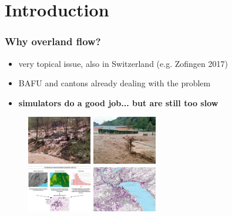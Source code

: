 \documentclass[xcolor=dvipsnames, USenglish]{beamer}  %
\begin{document}
\section{Introduction}
  \begin{frame}
    \frametitle{Why overland flow?}
    \begin{itemize}
      \item very topical issue, also in Switzerland (e.g. Zofingen 2017)
      \item BAFU and cantons already dealing with the problem
      \item \textbf{simulators do a good job... but are still too slow}
    \end{itemize}

    \begin{figure}
      \centering
        \includegraphics[width=0.25\textwidth]{img/overlandflow1.jpg}
        \quad
        \includegraphics[width=0.25\textwidth]{img/overlandflow2.jpg}
        \\
        \includegraphics[width=0.25\textwidth]{img/overlandflow_map1.jpg}
        \quad
        \includegraphics[width=0.25\textwidth]{img/overlandflow_map2.jpg}
    \end{figure}
  \end{frame}
\end{document}
